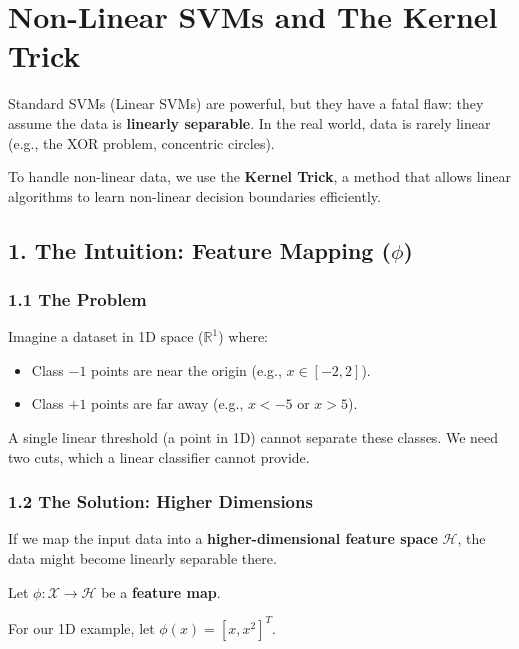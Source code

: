 \documentclass[
  italian,
  11pt,
]{article}
\begin{document}
\section{Non-Linear SVMs and The Kernel
Trick}\label{non-linear-svms-and-the-kernel-trick}

Standard SVMs (Linear SVMs) are powerful, but they have a fatal flaw:
they assume the data is \textbf{linearly separable}. In the real world,
data is rarely linear (e.g., the XOR problem, concentric circles).

To handle non-linear data, we use the \textbf{Kernel Trick}, a method
that allows linear algorithms to learn non-linear decision boundaries
efficiently.

\subsection{\texorpdfstring{1. The Intuition: Feature Mapping
(\(\phi\))}{1. The Intuition: Feature Mapping (\textbackslash phi)}}\label{the-intuition-feature-mapping-phi}

\subsubsection{1.1 The Problem}\label{the-problem}

Imagine a dataset in 1D space (\(\mathbb{R}^1\)) where:

\begin{itemize}
\item
  Class \(-1\) points are near the origin (e.g., \(x \in [-2, 2]\)).
\item
  Class \(+1\) points are far away (e.g., \(x < -5\) or \(x > 5\)).
\end{itemize}

A single linear threshold (a point in 1D) cannot separate these classes.
We need two cuts, which a linear classifier cannot provide.

\subsubsection{1.2 The Solution: Higher
Dimensions}\label{the-solution-higher-dimensions}

If we map the input data into a \textbf{higher-dimensional feature
space} \(\mathcal{H}\), the data might become linearly separable there.

Let \(\phi: \mathcal{X} \to \mathcal{H}\) be a \textbf{feature map}.

For our 1D example, let \(\phi(x) = [x, x^2]^T\).
\end{document}
